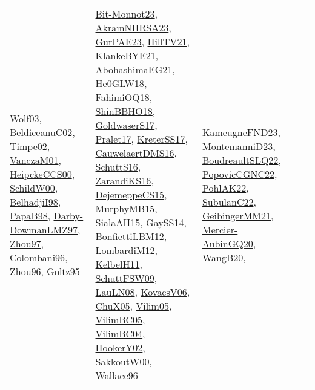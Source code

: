 {\begin{longtable}{llp{6cm}p{6cm}p{6cm}}
\href{papers/Wolf03.pdf}{Wolf03}\cite{Wolf03}, \href{papers/BeldiceanuC02.pdf}{BeldiceanuC02}\cite{BeldiceanuC02}, \href{articles/Timpe02.pdf}{Timpe02}\cite{Timpe02}, \href{papers/VanczaM01.pdf}{VanczaM01}\cite{VanczaM01}, \href{articles/HeipckeCCS00.pdf}{HeipckeCCS00}\cite{HeipckeCCS00}, \href{articles/SchildW00.pdf}{SchildW00}\cite{SchildW00}, \href{articles/BelhadjiI98.pdf}{BelhadjiI98}\cite{BelhadjiI98}, \href{articles/PapaB98.pdf}{PapaB98}\cite{PapaB98}, \href{articles/Darby-DowmanLMZ97.pdf}{Darby-DowmanLMZ97}\cite{Darby-DowmanLMZ97}, \href{articles/Zhou97.pdf}{Zhou97}\cite{Zhou97}, \href{papers/Colombani96.pdf}{Colombani96}\cite{Colombani96}, \href{papers/Zhou96.pdf}{Zhou96}\cite{Zhou96}, \href{papers/Goltz95.pdf}{Goltz95}\cite{Goltz95} & \href{papers/Bit-Monnot23.pdf}{Bit-Monnot23}\cite{Bit-Monnot23}, \href{articles/AkramNHRSA23.pdf}{AkramNHRSA23}\cite{AkramNHRSA23}, \href{articles/GurPAE23.pdf}{GurPAE23}\cite{GurPAE23}, \href{papers/HillTV21.pdf}{HillTV21}\cite{HillTV21}, \href{papers/KlankeBYE21.pdf}{KlankeBYE21}\cite{KlankeBYE21}, \href{articles/AbohashimaEG21.pdf}{AbohashimaEG21}\cite{AbohashimaEG21}, \href{papers/He0GLW18.pdf}{He0GLW18}\cite{He0GLW18}, \href{articles/FahimiOQ18.pdf}{FahimiOQ18}\cite{FahimiOQ18}, \href{articles/ShinBBHO18.pdf}{ShinBBHO18}\cite{ShinBBHO18}, \href{papers/GoldwaserS17.pdf}{GoldwaserS17}\cite{GoldwaserS17}, \href{papers/Pralet17.pdf}{Pralet17}\cite{Pralet17}, \href{articles/KreterSS17.pdf}{KreterSS17}\cite{KreterSS17}, \href{papers/CauwelaertDMS16.pdf}{CauwelaertDMS16}\cite{CauwelaertDMS16}, \href{papers/SchuttS16.pdf}{SchuttS16}\cite{SchuttS16}, \href{articles/ZarandiKS16.pdf}{ZarandiKS16}\cite{ZarandiKS16}, \href{papers/DejemeppeCS15.pdf}{DejemeppeCS15}\cite{DejemeppeCS15}, \href{papers/MurphyMB15.pdf}{MurphyMB15}\cite{MurphyMB15}, \href{papers/SialaAH15.pdf}{SialaAH15}\cite{SialaAH15}, \href{papers/GaySS14.pdf}{GaySS14}\cite{GaySS14}, \href{papers/BonfiettiLBM12.pdf}{BonfiettiLBM12}\cite{BonfiettiLBM12}, \href{articles/LombardiM12.pdf}{LombardiM12}\cite{LombardiM12}, \href{articles/KelbelH11.pdf}{KelbelH11}\cite{KelbelH11}, \href{papers/SchuttFSW09.pdf}{SchuttFSW09}\cite{SchuttFSW09}, \href{papers/LauLN08.pdf}{LauLN08}\cite{LauLN08}, \href{papers/KovacsV06.pdf}{KovacsV06}\cite{KovacsV06}, \href{papers/ChuX05.pdf}{ChuX05}\cite{ChuX05}, \href{papers/Vilim05.pdf}{Vilim05}\cite{Vilim05}, \href{articles/VilimBC05.pdf}{VilimBC05}\cite{VilimBC05}, \href{papers/VilimBC04.pdf}{VilimBC04}\cite{VilimBC04}, \href{papers/HookerY02.pdf}{HookerY02}\cite{HookerY02}, \href{articles/SakkoutW00.pdf}{SakkoutW00}\cite{SakkoutW00}, \href{articles/Wallace96.pdf}{Wallace96}\cite{Wallace96} & \href{papers/KameugneFND23.pdf}{KameugneFND23}\cite{KameugneFND23}, \href{articles/MontemanniD23.pdf}{MontemanniD23}\cite{MontemanniD23}, \href{papers/BoudreaultSLQ22.pdf}{BoudreaultSLQ22}\cite{BoudreaultSLQ22}, \href{papers/PopovicCGNC22.pdf}{PopovicCGNC22}\cite{PopovicCGNC22}, \href{articles/PohlAK22.pdf}{PohlAK22}\cite{PohlAK22}, \href{articles/SubulanC22.pdf}{SubulanC22}\cite{SubulanC22}, \href{papers/GeibingerMM21.pdf}{GeibingerMM21}\cite{GeibingerMM21}, \href{papers/Mercier-AubinGQ20.pdf}{Mercier-AubinGQ20}\cite{Mercier-AubinGQ20}, \href{papers/WangB20.pdf}{WangB20}\cite{WangB20}, 
\end{longtable}}
